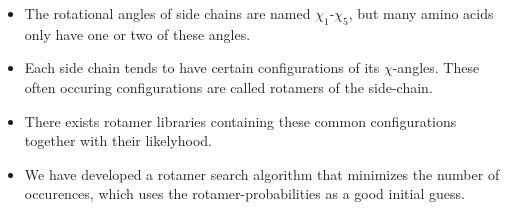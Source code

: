 \documentclass[a0,portrait]{a0poster}
\begin{document}
\begin{GridBlock}{51}{75}{48}
\begin{multicols}{2}
\begin{itemize}
\begin{minipage}{\linewidth}
\label{fig:lysine}
\end{minipage}
\vspace{1mm}
\item The rotational angles of side chains are named
  $\chi_1$-$\chi_5$, but many amino acids only have one or two of
  these angles.

\item Each side chain tends to have certain configurations of its
  $\chi$-angles. These often occuring configurations are called
  rotamers of the side-chain.

\item There exists rotamer libraries containing these common
  configurations together with their likelyhood.

\item We have developed a rotamer search algorithm that minimizes the
  number of occurences, which uses the rotamer-probabilities as a good
  initial guess.
\end{itemize}
\end{multicols}
\end{GridBlock}

\end{document}
